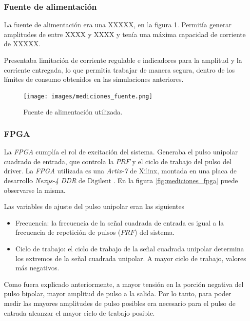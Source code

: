 \subsubsection{Fuente de alimentación}

La fuente de alimentación era una XXXXX, en la figura \ref{fig:mediciones_fuente}. Permitía generar amplitudes de entre
XXXX y XXXX y tenía una máxima capacidad de corriente de XXXXX.

Presentaba limitación de corriente regulable e indicadores para la amplitud y la
corriente entregada, lo que permitía trabajar de manera segura, dentro de los
límites de consumo obtenidos en las simulaciones anteriores.

\begin{figure}
  \centering
    \texttt{[image: images/mediciones\_fuente.png]}
    \caption{Fuente de alimentación utilizada.}
    \label{fig:mediciones_fuente}
\end{figure}


\subsubsection{FPGA}

La \textit{FPGA} cumplía el rol de excitación del sistema. Generaba el pulso
unipolar cuadrado de entrada, que controla la $PRF$ y el ciclo de trabajo del 
pulso del driver. La \textit{FPGA} utilizada es una \textit{Artix-7} de Xilinx,
montada en una placa de desarrollo \textit{Nexys-4 DDR} de Digilent
\cite{digilent_nexys4ddr}. En la figura
\ref{fig:mediciones_fpga} puede observarse la misma. 

Las variables de ajuste del pulso unipolar eran las siguientes

\begin{itemize}
  \item Frecuencia: la frecuencia de la señal cuadrada de entrada es igual a la
    frecuencia de repetición de pulsos ($PRF$) del sistema. 
  \item Ciclo de trabajo: el ciclo de trabajo de la señal cuadrada unipolar
    determina los extremos de la señal cuadrada unipolar. A mayor ciclo de
    trabajo, valores más negativos.
\end{itemize}

Como fuera explicado anteriormente, a mayor tensión en la porción negativa del
pulso bipolar, mayor amplitud de pulso a la salida. Por lo tanto, para poder
medir las mayores amplitudes de pulso posibles era necesario para el pulso de
entrada alcanzar el mayor ciclo de trabajo posible.

